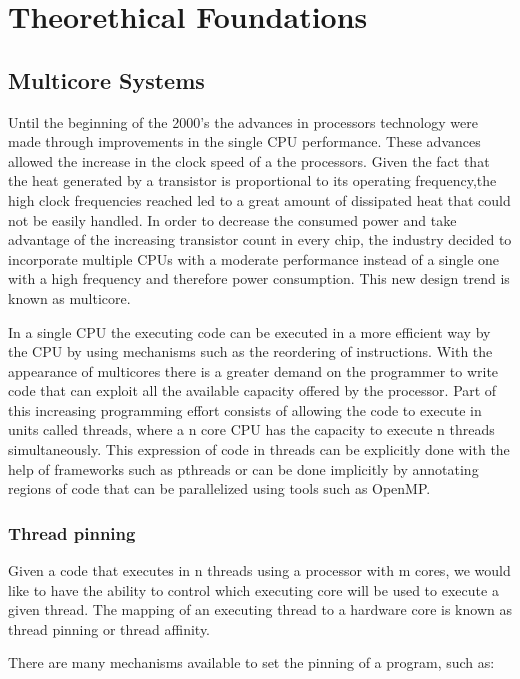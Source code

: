 \chapter{Theorethical Foundations}\label{chapter:theorethical}
\section{Multicore Systems}\label{section:multicore}
Until the beginning of the 2000's the advances in processors technology were made through improvements in the single CPU performance. These advances allowed the increase in the clock speed of a the processors. Given the fact that the heat generated by a transistor is proportional to its operating frequency,the high clock frequencies reached led to a great amount of dissipated heat that could not be easily handled. In order to decrease the consumed power and take advantage of the increasing transistor count in every chip, the industry decided to incorporate multiple CPUs with a moderate performance instead of a single one with a high frequency and therefore power consumption. This new design trend is known as multicore. 

In a single CPU the executing code can be executed in a more efficient way by the CPU by using mechanisms such as the reordering of instructions. With the appearance of multicores there is a greater demand on the programmer to write code that can exploit all the available capacity offered by the processor. Part of this increasing programming effort consists of allowing the code to execute in units called threads, where a n core CPU has the capacity to execute n threads simultaneously. This expression of code in threads can be explicitly done with the help of frameworks such as pthreads or can be done implicitly by annotating regions of code that can be parallelized using tools such as OpenMP.

\subsection{Thread pinning}\label{subsection:pinning}
Given a code that executes in n threads using a processor with m cores, we would like to have the ability to control which executing core will be used to execute a given thread. The mapping of an executing thread to a hardware core is known as thread pinning or thread affinity.

There are many mechanisms available to set the pinning of a program, such as:

